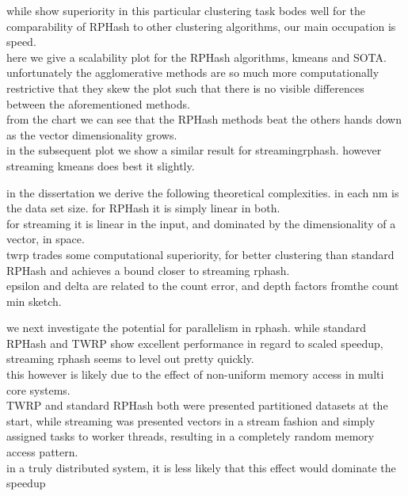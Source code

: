 \documentclass{beamer}
\begin{document}
\begin{frame}[plain]
while show superiority in this particular clustering task bodes well for the
comparability of RPHash to other clustering algorithms, our main occupation
is speed. \\
here we give a scalability plot for the RPHash algorithms, kmeans and
SOTA. unfortunately the agglomerative methods are so much more computationally
restrictive that they skew the plot such that there is no visible differences
between the aforementioned methods. \\
from the chart we can see that the RPHash
methods beat the others hands down as the vector dimensionality grows.\\
in the subsequent plot we show a similar result for streamingrphash. however
streaming kmeans does best it slightly.
\end{frame}

\begin{frame}[plain]
in the dissertation we derive the following theoretical complexities.
in each nm is the data set size. for RPHash it is simply linear in both.\\
for
streaming it is linear in the input, and dominated by the dimensionality
of a vector, in space. \\
twrp trades some computational superiority, for better
clustering than standard RPHash and achieves a bound closer to streaming
rphash. \\
epsilon and delta are related to the count error, and depth factors
fromthe count min sketch.
\end{frame}

\begin{frame}[plain]
we next investigate the potential for parallelism in rphash. while standard RPHash
and TWRP show excellent performance in regard to scaled speedup, streaming rphash
seems to level out pretty quickly. \\
this however is likely due to the effect of
non-uniform memory access in multi core systems. \\
TWRP and standard RPHash both
were presented partitioned datasets at the start, while streaming was presented
vectors in a stream fashion and simply assigned tasks to worker threads, resulting
in a completely random memory access pattern.\\
in a truly distributed system, it is
less likely that this effect would dominate the speedup
\end{frame}
\end{document}
